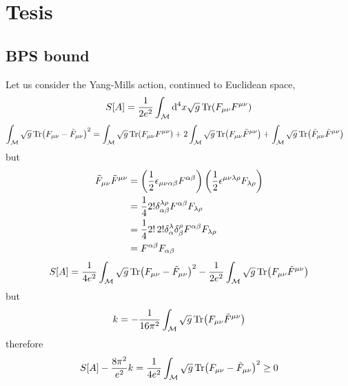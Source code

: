 \section{Tesis}
\subsection{BPS bound}
Let us consider the Yang-Mills action, continued to Euclidean space,
\begin{equation}
	S[A]=\frac{1}{2e^2}\int_{\mathcal{M}}\dd^4x\sqrt{g}\Tr(F_{\mu\nu}F^{\mu\nu })
\end{equation}
\begin{align}
	\int_{\mathcal{M}} \sqrt{g}\Tr(F_{\mu\nu }-\tilde{F}_{\mu\nu })^2&=\int_{\mathcal{M}} \sqrt{g}\Tr(F_{\mu\nu }F^{\mu\nu })+2\int_{\mathcal{M}} \sqrt{g}\Tr (F_{\mu\nu }\tilde{F}^{\mu\nu })+\int_{\mathcal{M}} \sqrt{g}\Tr(\tilde{F}_{\mu\nu }\tilde{F}^{\mu\nu })
\end{align}
but
\begin{align}
  \tilde{F}_{\mu\nu }\tilde{F}^{\mu\nu }&=\left(\frac{1}{2}\epsilon_{\mu\nu\alpha\beta }F^{\alpha\beta }\right)\left(\frac{1}{2}\epsilon^{\mu\nu\lambda\rho  }F_{\lambda\rho  }\right)\\
  &=\frac{1}{4}2!\delta^{\lambda\rho}_{\alpha\beta }F^{\alpha\beta }F_{\lambda\rho}\\
  &=\frac{1}{4}2!\, 2!\delta^\lambda_\alpha \delta^\rho_\beta F^{\alpha\beta }F_{\lambda\rho}\\
  &=F^{\alpha\beta }F_{\alpha\beta }
\end{align}
\begin{equation}
	S[A]=\frac{1}{4e^2}\int_{\mathcal{M}} \sqrt{g}\Tr(F_{\mu\nu }-\tilde{F}_{\mu\nu })^2-\frac{1}{2e^2}\int_{\mathcal{M}} \sqrt{g}\Tr(F_{\mu\nu}\tilde{F}^{\mu\nu })
\end{equation}
but
\begin{equation}
  k=-\frac{1}{16\pi^2}\int_{\mathcal{M}} \sqrt{g}\Tr(F_{\mu\nu}\tilde{F}^{\mu\nu })
\end{equation}
therefore
\begin{equation}
  S[A]-\frac{8\pi^2}{e^2}k=\frac{1}{4e^2}\int_{\mathcal{M}} \sqrt{g}\Tr(F_{\mu\nu }-\tilde{F}_{\mu\nu })^2\geq 0
\end{equation}


